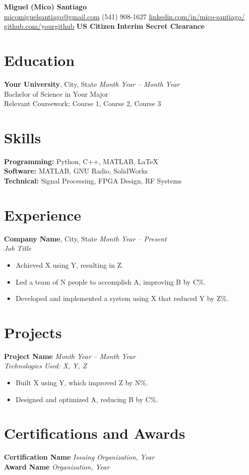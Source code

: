 \documentclass[a4paper,10pt]{article}
\begin{document}
\begin{center}
    {\LARGE \textbf{Miguel (Mico) Santiago}} \\
    \href{mailto:micomiguelsantiago@gmail.com}{micomiguelsantiago@gmail.com} \textbullet{}
    (541) 908-1627 \textbullet{}
    \href{https://www.linkedin.com/in/mico-santiago/}{linkedin.com/in/mico-santiago/} \textbullet{}
    \href{https://github.com/yourgithub}{github.com/yourgithub} \textbullet{} \textbf{US Citizen} \textbullet{} \textbf{Interim Secret Clearance}

\end{center}

\section*{Education}
\textbf{Your University}, City, State 
\hfill \textit{Month Year -- Month Year}\\
Bachelor of Science in Your Major\\
Relevant Coursework: Course 1, Course 2, Course 3

\section*{Skills}
\textbf{Programming:} Python, C++, MATLAB, LaTeX\\
\textbf{Software:} MATLAB, GNU Radio, SolidWorks\\
\textbf{Technical:} Signal Processing, FPGA Design, RF Systems

\section*{Experience}
\textbf{Company Name}, City, State 
\hfill \textit{Month Year -- Present}\\
\textit{Job Title}\\
\begin{itemize}[noitemsep, topsep=0pt]
    \item Achieved X using Y, resulting in Z.
    \item Led a team of N people to accomplish A, improving B by C\%.
    \item Developed and implemented a system using X that reduced Y by Z\%.
\end{itemize}

\section*{Projects}
\textbf{Project Name} \hfill \textit{Month Year -- Month Year}\\
\textit{Technologies Used: X, Y, Z}\\
\begin{itemize}[noitemsep, topsep=0pt]
    \item Built X using Y, which improved Z by N\%.
    \item Designed and optimized A, reducing B by C\%.
\end{itemize}



\section*{Certifications and Awards}
\textbf{Certification Name} \hfill \textit{Issuing Organization, Year}\\
\textbf{Award Name} \hfill \textit{Organization, Year}
\end{document}
